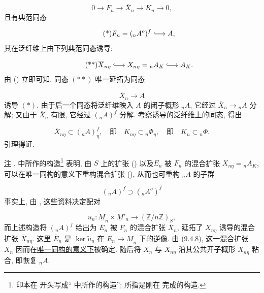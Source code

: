 \begin{equation*}
0\longrightarrow F_n\longrightarrow\overline X_n
 \longrightarrow K_n\longrightarrow0,
\end{equation*}
且有典范同态

\begin{equation}\tag{*}
F_n=({}_nA^o)^f\lhook\joinrel\longrightarrow A,
\end{equation}
其在泛纤维上由下列典范同态诱导:

\begin{equation}\tag{**}
\overline X_{n\eta}\lhook\joinrel\longrightarrow X_{n\eta}
 ={}_nA_K\lhook\joinrel\longrightarrow A_K.
\end{equation}
由 () 立即可知, 同态 $(**)$ 唯一延拓为同态

\begin{equation}\tag{***}
\overline X_n\longrightarrow A
\end{equation}
诱导 $(*)$. 由于后一个同态将泛纤维映入 $A$ 的闭子概形 ${}_nA$, 它经过 $\overline X_n\to{}_nA$ 分解; 又由于 $\overline X_n$ 有限, 它经过 $({}_nA)^f$ 分解. 考察诱导的泛纤维上的同态, 得出

\begin{equation*}
\overline X_{n\eta}\subset({}_nA)^f_\eta,
\quad\text{即}\quad
K_{n\eta}\subset{}_n\Phi_\eta,
\quad\text{即}\quad
K_n\subset{}_n\Phi.
\end{equation*}
引理得证.

\medskip
\noindent
\underline{注} .  中所作的构造\footnote{印本在  开头写成“ 中所作的构造”; 所指是刚在  完成的构造.} 表明, 由 $S$ 上的扩张 () 以及$E_n$ 被 $F_n$ 的混合扩张 $X_{n\eta}={}_nA_K$, 可以在唯一同构的意义下重构混合扩张 (), 从而也可重构 ${}_nA$ 的子群

\begin{equation*}
({}_nA)^f\supset({}_nA^o)^f
\end{equation*}
事实上, 由 , 这些资料决定配对

\begin{equation*}
u_n:\underline M_n\times\underline M'_n
 \longrightarrow(\mathbb Z/n\mathbb Z)_S,
\end{equation*}
而上述构造将 $({}_nA)^f$ 给出为 $\overline E_n$ 被 $F_n$ 的混合扩张 $\overline X_n$, 延拓了 $X_{n\eta}$ 诱导的混合扩张 $\overline X_{n\eta}$. 这里 $\overline E_n$ 是 $\ker\widetilde u_n$ 在 $E_n\to\underline M_n$ 下的逆像. 由 (9.4.8), 这一混合扩张 $\overline X_n$ 因而在\underline{唯一同构的意义下}被确定. 随后将 $\overline X_n$ 与 $X_{n\eta}$ 沿其公共开子概形 $\overline X_{n\eta}$ 粘合, 即恢复 ${}_nA$.


